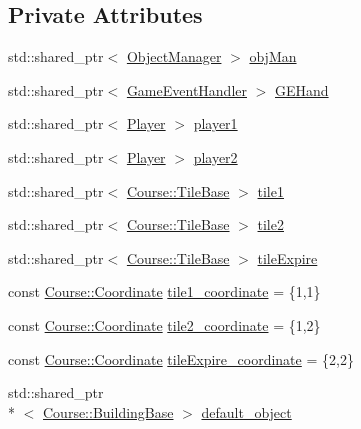 \subsection*{Private Attributes}
\begin{DoxyCompactItemize}
\item 
std\-::shared\-\_\-ptr$<$ \hyperlink{classGame_1_1ObjectManager}{Object\-Manager} $>$ \hyperlink{classdefault__building_a9f19657073191d1ccfae1537bd1bc574}{obj\-Man}
\item 
std\-::shared\-\_\-ptr$<$ \hyperlink{classGame_1_1GameEventHandler}{Game\-Event\-Handler} $>$ \hyperlink{classdefault__building_a7bf9c55301d5a6027d016bf76cb585ce}{G\-E\-Hand}
\item 
std\-::shared\-\_\-ptr$<$ \hyperlink{classGame_1_1Player}{Player} $>$ \hyperlink{classdefault__building_a0459e600394868e19bb88ababc4e50ae}{player1}
\item 
std\-::shared\-\_\-ptr$<$ \hyperlink{classGame_1_1Player}{Player} $>$ \hyperlink{classdefault__building_a27f3d517ae073d9088c533a83a287ba5}{player2}
\item 
std\-::shared\-\_\-ptr$<$ \hyperlink{classCourse_1_1TileBase}{Course\-::\-Tile\-Base} $>$ \hyperlink{classdefault__building_a4851bd1b8736d29d5608dcbd85bca338}{tile1}
\item 
std\-::shared\-\_\-ptr$<$ \hyperlink{classCourse_1_1TileBase}{Course\-::\-Tile\-Base} $>$ \hyperlink{classdefault__building_adcb7e13de2a868910460f1ca658e44b0}{tile2}
\item 
std\-::shared\-\_\-ptr$<$ \hyperlink{classCourse_1_1TileBase}{Course\-::\-Tile\-Base} $>$ \hyperlink{classdefault__building_a03bf0e5b69cdc4c06be2d1ef255f8550}{tile\-Expire}
\item 
const \hyperlink{classCourse_1_1Coordinate}{Course\-::\-Coordinate} \hyperlink{classdefault__building_a9bf0749a6f397a82c5a939fb6fca6f43}{tile1\-\_\-coordinate} = \{1,1\}
\item 
const \hyperlink{classCourse_1_1Coordinate}{Course\-::\-Coordinate} \hyperlink{classdefault__building_a6ba4a9f3044210aacfb738b593a585b7}{tile2\-\_\-coordinate} = \{1,2\}
\item 
const \hyperlink{classCourse_1_1Coordinate}{Course\-::\-Coordinate} \hyperlink{classdefault__building_a5fadd5f10435b00e89e58ce9e32c57e5}{tile\-Expire\-\_\-coordinate} = \{2,2\}
\item 
std\-::shared\-\_\-ptr\\*
$<$ \hyperlink{classCourse_1_1BuildingBase}{Course\-::\-Building\-Base} $>$ \hyperlink{classdefault__building_afa2b3230dc8c603474fcf7dbf76c47c4}{default\-\_\-object}

\end{DoxyCompactItemize}
